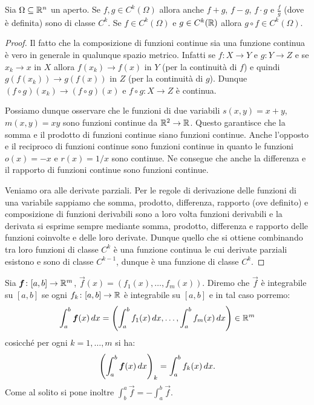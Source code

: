 \begin{theorem}
Sia $\Omega \subseteq \mathbb R^n$ un aperto.
Se $f,g\in C^k(\Omega)$ allora anche $f+g$, $f-g$, $f\cdot g$ e $\frac{f}{g}$
(dove è definita) sono di classe $C^k$. Se $f\in C^k(\Omega)$ e $g\in C^k(\mathbb R)$
allora $g\circ f \in C^k(\Omega)$.
\end{theorem}
%
\begin{proof}
Il fatto che la composizione di funzioni continue sia una funzione continua
è vero in generale in qualunque spazio metrico.
Infatti se $f\colon X\to Y$ e $g\colon Y \to Z$ e se $x_k\to x$ in $X$
allora $f(x_k) \to f(x)$ in $Y$ (per la continuità di $f$)
e quindi $g(f(x_k)) \to g(f(x))$ in $Z$ (per la continuità di $g$).
Dunque $(f \circ g)(x_k) \to (f\circ g)(x)$ e $f\circ g\colon X\to Z$ è continua.

Possiamo dunque osservare che le funzioni di due variabili $s(x,y) = x+y$,
$m(x,y)=xy$ sono funzioni continue da $\mathbb R^2\to \mathbb R$. Questo garantisce
che la somma e il prodotto di funzioni continue siano funzioni continue.
Anche l'opposto e il reciproco di funzioni continue sono funzioni continue
in quanto le funzioni $o(x)=-x$ e $r(x)=1/x$ sono continue.
Ne consegue che anche la differenza e il rapporto di funzioni continue sono
funzioni continue.

Veniamo ora alle derivate parziali.
Per le regole di derivazione delle funzioni di una variabile sappiamo che
somma, prodotto, differenza, rapporto (ove definito) e composizione
di funzioni derivabili sono
a loro volta funzioni derivabili e la derivata si esprime sempre mediante
somma, prodotto, differenza e rapporto delle funzioni coinvolte e delle loro
derivate. Dunque quello che si ottiene combinando tra loro funzioni
di classe $C^k$ è una funzione continua le cui derivate parziali esistono e
sono di classe $C^{k-1}$, dunque è una funzione di classe $C^k$.
\end{proof}

\begin{definition}
Sia $\boldsymbol f\colon [a,b]\to \mathbb R^m$, $\vec f(x) = (f_1(x), \dots, f_m(x))$.
Diremo che $\vec f$ è integrabile su $[a,b]$ se ogni
$f_k\colon[a,b]\to \mathbb R$ è integrabile su $[a,b]$ e in tal caso porremo:
\[
  \int_a^b \boldsymbol f(x)\, dx
  = {\left( \int_a^b f_1(x)\, dx, \dots, \int_a^b f_m(x)\, dx \right)}
  \in \mathbb R^m
\]
cosicché per ogni $k=1,\dots, m$ si ha:
\[
  {\left( \int_a^b \boldsymbol f(x)\, dx \right)}_k = \int_a^b f_k(x)\, dx.
\]
Come al solito si pone inoltre $\int_b^a \vec f = - \int_a^b \vec f$.
\end{definition}

